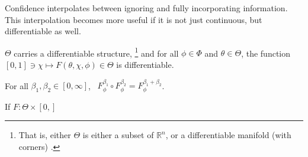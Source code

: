 
Confidence interpolates between ignoring and fully incorporating 
information. This interpolation becomes more useful
if it is not just continuous, but differentiable as well.

\begin{CFaxioms}
	\item \label{ax:diffble}
	$\Theta$
	carries a differentiable structure,
	\unskip\footnote{
		That is, either 
		$\Theta$ is either a subset of $\mathbb R^n$,
	 	or a differentiable manifold (with corners) 
		\parencite{lee2013smooth,joyce2009manifolds-w/corners}.}
	and for all $\phi \in \Phi$ and $\theta \in \Theta$, 
	the function $[0,1] \ni \chi \mapsto F(\theta,\chi,\phi) \in \Theta$
	is differentiable.
\end{CFaxioms}





\begin{CFaxioms}
	\item For all
		$\beta_1, \beta_2 \in [0,\infty]$,~
		$F^{\beta_1}_\phi \circ F^{\beta_2}_\phi = F^{\beta_1 + \beta_2}_\phi$.
		\label{ax:additivity}
\end{CFaxioms}

\begin{theorem}
	If $F : \Theta \times [0, ]$
\end{theorem}




